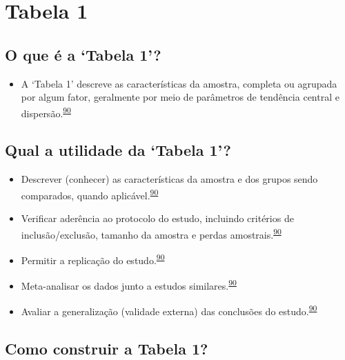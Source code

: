 \documentclass[
]{book}
\providecommand{\tightlist}{%
  \setlength{\itemsep}{0pt}\setlength{\parskip}{0pt}}
\begin{document}
\hypertarget{tabela-1}{%
\section{Tabela 1}\label{tabela-1}}

\hypertarget{o-que-uxe9-a-tabela-1}{%
\subsection{O que é a `Tabela 1'?}\label{o-que-uxe9-a-tabela-1}}

\begin{itemize}
\tightlist
\item
  A `Tabela 1' descreve as características da amostra, completa ou agrupada por algum fator, geralmente por meio de parâmetros de tendência central e dispersão.\textsuperscript{\protect\hyperlink{ref-chen2020}{90}}
\end{itemize}

\hypertarget{qual-a-utilidade-da-tabela-1}{%
\subsection{Qual a utilidade da `Tabela 1'?}\label{qual-a-utilidade-da-tabela-1}}

\begin{itemize}
\item
  Descrever (conhecer) as características da amostra e dos grupos sendo comparados, quando aplicável.\textsuperscript{\protect\hyperlink{ref-chen2020}{90}}
\item
  Verificar aderência ao protocolo do estudo, incluindo critérios de inclusão/exclusão, tamanho da amostra e perdas amostrais.\textsuperscript{\protect\hyperlink{ref-chen2020}{90}}
\item
  Permitir a replicação do estudo.\textsuperscript{\protect\hyperlink{ref-chen2020}{90}}
\item
  Meta-analisar os dados junto a estudos similares.\textsuperscript{\protect\hyperlink{ref-chen2020}{90}}
\item
  Avaliar a generalização (validade externa) das conclusões do estudo.\textsuperscript{\protect\hyperlink{ref-chen2020}{90}}
\end{itemize}

\hypertarget{como-construir-a-tabela-1}{%
\subsection{Como construir a Tabela 1?}\label{como-construir-a-tabela-1}}
\end{document}
